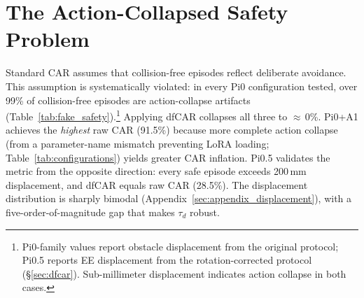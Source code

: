 \section{The Action-Collapsed Safety Problem}\label{sec:fake_safety}

Standard CAR assumes that collision-free episodes reflect deliberate avoidance. This assumption is systematically violated: in every Pi0 configuration tested, over 99\% of collision-free episodes are action-collapse artifacts (Table~\ref{tab:fake_safety}).\footnote{Pi0-family values report obstacle displacement from the original protocol; Pi0.5 reports EE displacement from the rotation-corrected protocol (\S\ref{sec:dfcar}). Sub-millimeter displacement indicates action collapse in both cases.} Applying dfCAR collapses all three to ${\approx}$\,0\%. Pi0+A1 achieves the \emph{highest} raw CAR (91.5\%) because more complete action collapse (from a parameter-name mismatch preventing LoRA loading; Table~\ref{tab:configurations}) yields greater CAR inflation. Pi0.5 validates the metric from the opposite direction: every safe episode exceeds 200\,mm displacement, and dfCAR equals raw CAR (28.5\%). The displacement distribution is sharply bimodal (Appendix~\ref{sec:appendix_displacement}), with a five-order-of-magnitude gap that makes $\tau_d$ robust.

\begin{table}[t]
\centering
\caption{Action-collapse decomposition on SafeLIBERO. dfCAR excludes episodes with displacement $< \tau_d = 0.1$\,mm. Pi0+A1 dfCAR$\,\approx\,$0: only 3/732 safe episodes exceed the threshold.}
\label{tab:fake_safety}
\vspace{2pt}
\small
{}
\end{table}

